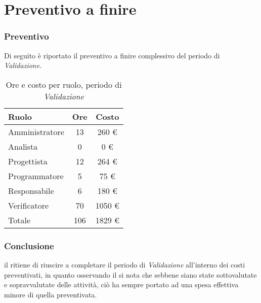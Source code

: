 \section{Preventivo a finire}
\subsubsection{Preventivo}
Di seguito \`e riportato il preventivo a finire complessivo del periodo di \textit{Validazione}.

\begin{table}[H]
	\centering
	\begin{tabular}{ l c c }
		\textbf{Ruolo} & \textbf{Ore} & \textbf{Costo} \\
		\hline
		Amministratore & 13 & 260 \euro{} \\
		Analista & 0 & 0 \euro{} \\
		Progettista & 12 & 264 \euro{} \\
		Programmatore & 5 & 75 \euro{} \\
		Responsabile & 6 & 180 \euro{} \\
		Verificatore & 70 & 1050 \euro{} \\
		\hline
		Totale & 106 & 1829 \euro{} \\
		\hline
	\end{tabular}
	\caption{Ore e costo per ruolo, periodo di \textit{Validazione}}
\end{table}


\subsubsection{Conclusione}
il  ritiene di riuscire a completare il periodo di \textit{Validazione} all'interno dei costi preventivati, in quanto osservando il  si nota che sebbene siano state sottovalutate e sopravvalutate delle attivit\`a, ci\`o ha sempre portato ad una spesa effettiva minore di quella preventivata.

\newpage